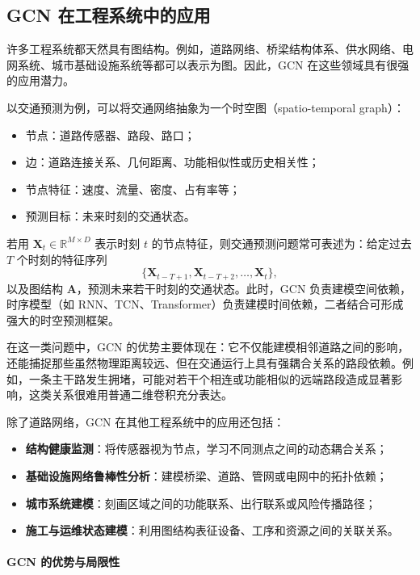 \subsection{GCN 在工程系统中的应用}

许多工程系统都天然具有图结构。例如，道路网络、桥梁结构体系、供水网络、电网系统、城市基础设施系统等都可以表示为图。因此，GCN 在这些领域具有很强的应用潜力。

以交通预测为例，可以将交通网络抽象为一个时空图（spatio-temporal graph）：
\begin{itemize}
    \item 节点：道路传感器、路段、路口；
    \item 边：道路连接关系、几何距离、功能相似性或历史相关性；
    \item 节点特征：速度、流量、密度、占有率等；
    \item 预测目标：未来时刻的交通状态。
\end{itemize}

若用 $\mathbf{X}_t \in \mathbb{R}^{M\times D}$ 表示时刻 $t$ 的节点特征，则交通预测问题常可表述为：给定过去 $T$ 个时刻的特征序列
\begin{equation}
    \{\mathbf{X}_{t-T+1}, \mathbf{X}_{t-T+2}, \dots, \mathbf{X}_t\},
\end{equation}
以及图结构 $\mathbf{A}$，预测未来若干时刻的交通状态。此时，GCN 负责建模空间依赖，时序模型（如 RNN、TCN、Transformer）负责建模时间依赖，二者结合可形成强大的时空预测框架。

在这一类问题中，GCN 的优势主要体现在：它不仅能建模相邻道路之间的影响，还能捕捉那些虽然物理距离较远、但在交通运行上具有强耦合关系的路段依赖。例如，一条主干路发生拥堵，可能对若干个相连或功能相似的远端路段造成显著影响，这类关系很难用普通二维卷积充分表达。

除了道路网络，GCN 在其他工程系统中的应用还包括：
\begin{itemize}
    \item \textbf{结构健康监测}：将传感器视为节点，学习不同测点之间的动态耦合关系；
    \item \textbf{基础设施网络鲁棒性分析}：建模桥梁、道路、管网或电网中的拓扑依赖；
    \item \textbf{城市系统建模}：刻画区域之间的功能联系、出行联系或风险传播路径；
    \item \textbf{施工与运维状态建模}：利用图结构表征设备、工序和资源之间的关联关系。
\end{itemize}

\paragraph{GCN 的优势与局限性}

